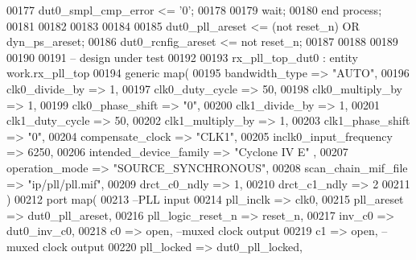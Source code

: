 \begin{DoxyCode}
00177          \textcolor{vhdlchar}{dut0_smpl_cmp_error}  \textcolor{vhdlchar}{<=} \textcolor{vhdlchar}{'}\textcolor{vhdllogic}{}\textcolor{vhdllogic}{0}\textcolor{vhdlchar}{'};
00178       
00179       \textcolor{keywordflow}{wait};
00180    \textcolor{keywordflow}{end} \textcolor{keywordflow}{process};
00181    
00182    
00183    
00184    
00185    \textcolor{vhdlchar}{dut0_pll_areset}      \textcolor{vhdlchar}{<=} \textcolor{vhdlchar}{(}\textcolor{keywordflow}{not} \textcolor{vhdlchar}{reset_n}\textcolor{vhdlchar}{)} \textcolor{keywordflow}{OR} \textcolor{vhdlchar}{dyn_ps_areset};
00186    \textcolor{vhdlchar}{dut0_rcnfig_areset}   \textcolor{vhdlchar}{<=} \textcolor{keywordflow}{not} \textcolor{vhdlchar}{reset_n};
00187    
00188    
00189    
00190    
00191 \textcolor{keyword}{      -- design under test  }
00192 
00193    rx\_pll\_top\_dut0 : \textcolor{keywordflow}{entity} work.rx_pll_top 
00194    \textcolor{keywordflow}{generic} \textcolor{keywordflow}{map}(
00195       bandwidth_type          => \textcolor{keyword}{"AUTO"},
00196       clk0_divide_by          => \textcolor{vhdllogic}{1},
00197       clk0_duty_cycle         => \textcolor{vhdllogic}{50},
00198       clk0_multiply_by        => \textcolor{vhdllogic}{1},
00199       clk0_phase_shift        => "\textcolor{vhdllogic}{0}",
00200       clk1_divide_by          => \textcolor{vhdllogic}{1},
00201       clk1_duty_cycle         => \textcolor{vhdllogic}{50},
00202       clk1_multiply_by        => \textcolor{vhdllogic}{1},
00203       clk1_phase_shift        => "\textcolor{vhdllogic}{0}",
00204       compensate_clock        => \textcolor{keyword}{"CLK1"},
00205       inclk0_input_frequency  => \textcolor{vhdllogic}{6250},
00206       intended_device_family  => \textcolor{keyword}{"Cyclone IV E"}  ,
00207       operation_mode          => \textcolor{keyword}{"SOURCE\_SYNCHRONOUS"},
00208       scan_chain_mif_file     => \textcolor{keyword}{"ip/pll/pll.mif"},
00209       drct_c0_ndly            => \textcolor{vhdllogic}{1},
00210       drct_c1_ndly            => \textcolor{vhdllogic}{2}
00211    \textcolor{vhdlchar}{)}
00212    \textcolor{keywordflow}{port} \textcolor{keywordflow}{map}(
00213 \textcolor{keyword}{   --PLL input }
00214    pll_inclk         => clk0,
00215    pll_areset        => dut0_pll_areset,
00216    pll_logic_reset_n => reset_n,
00217    inv_c0            => dut0_inv_c0,
00218    c0                => \textcolor{keywordflow}{open},\textcolor{keyword}{ --muxed clock output}
00219    c1                => \textcolor{keywordflow}{open},\textcolor{keyword}{ --muxed clock output}
00220    pll_locked        => dut0_pll_locked,

\end{DoxyCode}
